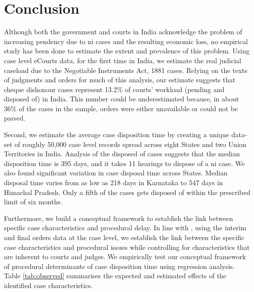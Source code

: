 \documentclass[12pt,a4paper]{article}
\begin{document}
\section{Conclusion}
\label{sec:conclusion}

Although both the government and courts in India acknowledge the problem of increasing pendency due to \gls{ni} cases and the resulting economic loss, no empirical study has been done to estimate the extent and prevalence of this problem. Using case level eCourts data, for the first time in India, we estimate the real judicial caseload due to the Negotiable Instruments Act, 1881 cases. Relying on the texts of judgments and orders for much of this analysis, our estimate suggests that cheque dishonour cases represent 13.2\% of courts' workload (pending and disposed of) in India. This number could be underestimated because, in about 36\% of the cases in the sample, orders were either unavailable or could not be parsed.

Second, we estimate the average case disposition time by creating a unique data-set of roughly 50,000 case level records spread across eight States and two Union Territories in India. Analysis of the disposed of cases suggests that the median disposition time is 395 days, and it takes 11 hearings to dispose of a \gls{ni} case. We also found significant variation in case disposal time across States. Median disposal time varies from as low as 218 days in Karnataka to 547 days in Himachal Pradesh. Only a fifth of the cases gets disposed of within the prescribed limit of six months.

Furthermore, we build a conceptual framework to establish the link between specific case characteristics and procedural delay. In line with \cite{bielen2015}, using the interim and final orders data at the case level, we establish the link between the specific case characteristics and procedural issues while controlling for characteristics that are inherent to courts and judges. We empirically test our conceptual framework of procedural determinants of case disposition time using regression analysis. Table \ref{tab:observed} summarises the expected and estimated effects of the identified case characteristics.
\end{document}
